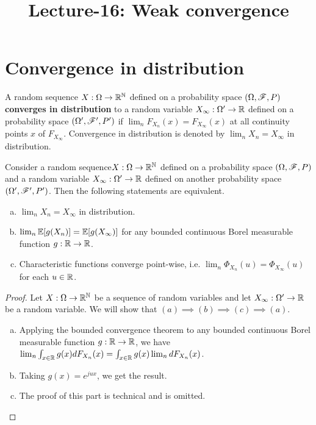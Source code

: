 \documentclass[letterpaper,10pt,english]{article}
\title{Lecture-16: Weak convergence}%
\author{}
\begin{document}
\maketitle

\section{Convergence in distribution}
\begin{defn} 
A  random sequence $X:\Omega\to\mathbb{R}^{\mathbb{N}}$ defined on a probability space $(\Omega, \mathscr{F}, P)$ \textbf{converges in distribution} to a random variable $X_\infty:\Omega'\to\mathbb{R}$ defined on a probability space $(\Omega', \mathscr{F}', P')$  if $\lim_nF_{X_n}(x) = F_{X_\infty}(x)$ at all continuity points $x$ of $F_{X_\infty}$. 
Convergence in distribution is denoted by $\lim_nX_n = X_\infty$ in distribution. 
\end{defn}
\begin{prop}
\label{Prop:ConvDistEquivalence}
Consider a random sequence$X:\Omega\to\mathbb{R}^{\mathbb{N}}$ defined on a probability space $(\Omega, \mathscr{F}, P)$ and a random variable $X_\infty: \Omega'\to\mathbb{R}$ defined on another probability space $(\Omega', \mathscr{F}', P')$.  
Then the following statements are equivalent.
\begin{enumerate}[(a)]
\item $\lim_nX_n = X_\infty$ in distribution.
\item $\lim_n\mathbb{E}[g(X_n)] = \mathbb{E}[g(X_\infty)]$ for any bounded continuous Borel measurable function $g:\mathbb{R}\to\mathbb{R}$.
\item Characteristic functions converge point-wise, i.e. 
$\lim_n\Phi_{X_n}(u) = \Phi_{X_\infty}(u)$ for each $u \in \mathbb{R}$. 
\end{enumerate}
\end{prop}
\begin{proof}
Let $X:\Omega\to\mathbb{R}^{\mathbb{N}}$ be a sequence of random variables and let $X_\infty:\Omega'\to\mathbb{R}$ be a random variable. 
We will show that $(a) \implies (b) \implies (c) \implies (a)$.
\begin{enumerate}[(a)]
\item [$(a) \implies (b)$:] 
Applying the bounded convergence theorem to any bounded continuous Borel measurable function $g:\mathbb{R}\to\mathbb{R}$, we have $\lim_n\int_{x \in \mathbb{R}} g(x)dF_{X_n}(x) = \int_{x \in \mathbb{R}} g(x)\lim_ndF_{X_n}(x)$.
\item [$(b) \implies (c)$:] 
Taking $g(x) = e^{jux}$, we get the result. 
\item [$ (c) \implies (a)$:] 
The proof of this part is technical and is omitted.
\end{enumerate}
\end{proof}
\end{document}
